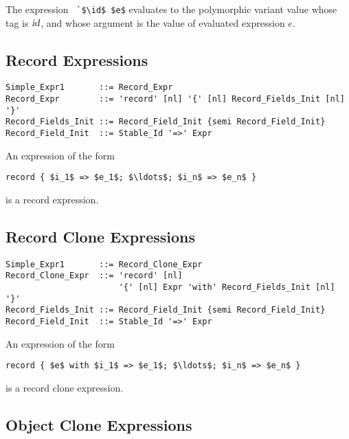 The expression ~\lstinline!`$\id$ $e$! evaluates to the polymorphic variant value whose tag is $\mbox{\sl id}$, and whose argument is the value of evaluated expression $e$. 





\subsection{Record Expressions}
\label{sec:record-expressions}

\syntax\begin{lstlisting}
Simple_Expr1       ::= Record_Expr
Record_Expr        ::= 'record' [nl] '{' [nl] Record_Fields_Init [nl] '}'
Record_Fields_Init ::= Record_Field_Init {semi Record_Field_Init}
Record_Field_Init  ::= Stable_Id '=>' Expr
\end{lstlisting}

An expression of the form
\begin{lstlisting}
record { $i_1$ => $e_1$; $\ldots$; $i_n$ => $e_n$ }
\end{lstlisting}
is a record expression. 






\subsection{Record Clone Expressions}
\label{sec:record-clone-expressions}

\syntax\begin{lstlisting}
Simple_Expr1       ::= Record_Clone_Expr
Record_Clone_Expr  ::= 'record' [nl] 
                       '{' [nl] Expr 'with' Record_Fields_Init [nl] '}'
Record_Fields_Init ::= Record_Field_Init {semi Record_Field_Init}
Record_Field_Init  ::= Stable_Id '=>' Expr
\end{lstlisting}

An expression of the form
\begin{lstlisting}
record { $e$ with $i_1$ => $e_1$; $\ldots$; $i_n$ => $e_n$ }
\end{lstlisting}
is a record clone expression. 





\subsection{Object Clone Expressions}
\label{sec:object-clone-expressions}

